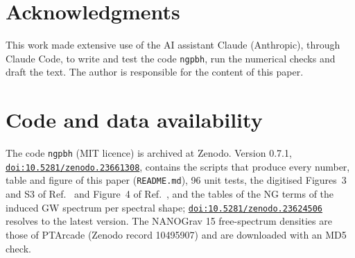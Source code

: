 \documentclass{article}
\begin{document}
\section*{Acknowledgments}

This work made extensive use of the AI assistant Claude (Anthropic), through Claude Code, to write
and test the code \texttt{ngpbh}, run the numerical checks and draft the text. The author is
responsible for the content of this paper.

\section*{Code and data availability}

The code \texttt{ngpbh} (MIT licence) is archived at Zenodo. Version 0.7.1,
\href{https://doi.org/10.5281/zenodo.23661308}{\nolinkurl{doi:10.5281/zenodo.23661308}},
contains the scripts that produce every number, table and figure of this paper
(\texttt{README.md}), 96 unit tests, the digitised Figures~3 and S3 of Ref.~\cite{FIVT23} and
Figure~4 of Ref.~\cite{ALW21}, and the tables of the NG terms of the induced GW spectrum per
spectral shape; \href{https://doi.org/10.5281/zenodo.23624506}{\nolinkurl{doi:10.5281/zenodo.23624506}}
resolves to the latest version. The NANOGrav 15 free-spectrum densities are those of PTArcade (Zenodo record 10495907)
and are downloaded with an MD5 check.



\end{document}
